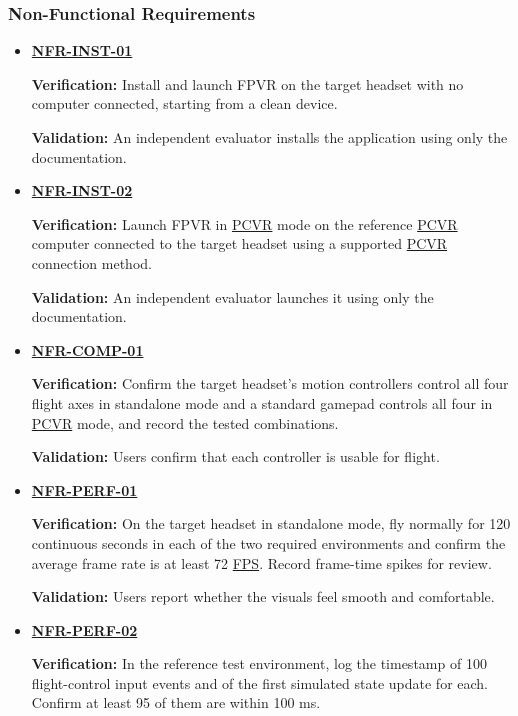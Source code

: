 \documentclass[12pt]{article}
\begin{document}
\subsubsection{Non-Functional Requirements}
\begin{itemize}
\item \hyperlink{req:NFR-INST-01}{\textbf{NFR-INST-01}}\par
 \textbf{Verification:} Install and launch FPVR on the target headset with
 no computer connected, starting from a clean device.\par
 \textbf{Validation:} An independent evaluator installs the application using
 only the documentation.
\item \hyperlink{req:NFR-INST-02}{\textbf{NFR-INST-02}}\par
 \textbf{Verification:} Launch FPVR in \hyperlink{glos:PCVR}{PCVR} mode on the reference \hyperlink{glos:PCVR}{PCVR}
 computer connected to the target headset using a supported \hyperlink{glos:PCVR}{PCVR} connection
 method.\par
 \textbf{Validation:} An independent evaluator launches it using only the documentation.
\item \hyperlink{req:NFR-COMP-01}{\textbf{NFR-COMP-01}}\par
 \textbf{Verification:} Confirm the target headset's motion controllers
 control all four flight axes in standalone mode and a standard gamepad
 controls all four in \hyperlink{glos:PCVR}{PCVR} mode, and record the tested combinations.\par
 \textbf{Validation:} Users confirm that each controller is usable for flight.
\item \hyperlink{req:NFR-PERF-01}{\textbf{NFR-PERF-01}}\par
 \textbf{Verification:} On the target headset in standalone mode, fly normally for
 120 continuous seconds in each of the two required environments and confirm
 the average frame rate is at least 72 \hyperlink{glos:FPS}{FPS}. Record frame-time spikes for
 review.\par
 \textbf{Validation:} Users report whether the visuals feel smooth and comfortable.
\item \hyperlink{req:NFR-PERF-02}{\textbf{NFR-PERF-02}}\par
 \textbf{Verification:} In the reference test environment, log the timestamp of
 100 flight-control input events and of the first simulated state update for
 each. Confirm at least 95 of them are within 100 ms.\par

\end{itemize}
\end{document}
